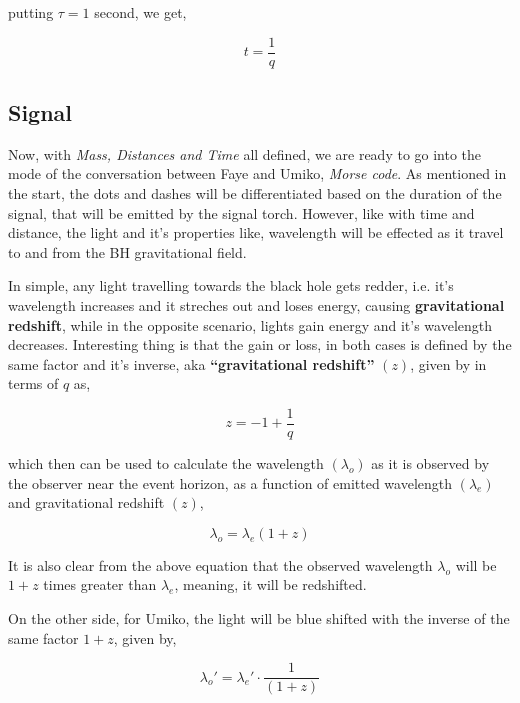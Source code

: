 \documentclass[9pt,a4paper,twocolumn,twoside]{tau-class/tau}
\begin{document}
      putting \(\tau = 1\) second, we get, 

      \begin{equation}
        \boxed{t = \frac{1}{q}}
      \end{equation}


    \subsection{Signal}

    Now, with \emph{Mass, Distances and Time} all defined, we are ready to go into the mode of the conversation between Faye and Umiko, \emph{Morse code}. As mentioned in the start, the dots and dashes will be differentiated based on the duration of the signal, that will be emitted by the signal torch. However, like with time and distance, the light and it's properties like, wavelength will be effected as it travel to and from the BH gravitational field. 

    In simple, any light travelling towards the black hole gets redder, i.e. it's wavelength increases and it streches out and loses energy, causing \textbf{gravitational redshift}, while in the opposite scenario, lights gain energy and it's wavelength decreases. Interesting thing is that the gain or loss, in both cases is defined by the same factor and it's inverse, aka \textbf{``gravitational redshift''} \((z)\), given by in terms of \(q\) as, 

    \begin{equation}
        \boxed{z = -1 + \frac{1}{q}}
    \end{equation}

    which then can be used to calculate the wavelength \((\lambda_o)\) as it is observed by the observer near the event horizon, as a function of emitted wavelength \((\lambda_e)\) and gravitational redshift \((z)\), 

    \begin{equation}
        \boxed{\lambda_o = \lambda_e (1 + z)}
    \end{equation}

    It is also clear from the above equation that the observed wavelength \(\lambda_o\) will be \(1 + z\) times greater than \(\lambda_e\), meaning, it will be redshifted.

    On the other side, for Umiko, the light will be blue shifted with the inverse of the same factor \(1 + z\), given by, 

    \begin{equation}
        \boxed{\lambda_{o}' = \lambda_{e}' \cdot \frac{1}{(1+z)}}
    \end{equation}
\end{document}

